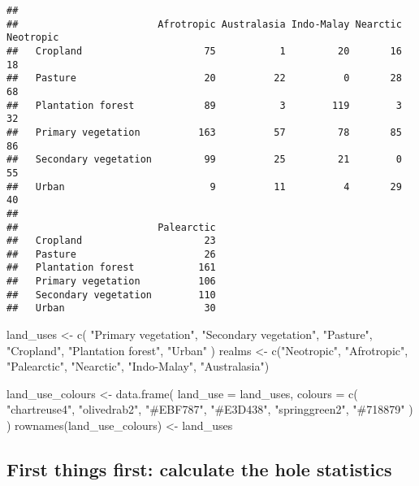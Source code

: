 \documentclass[
]{article}
\newenvironment{Shaded}{\begin{snugshade}}{\end{snugshade}}
\newcommand{\AttributeTok}[1]{\textcolor[rgb]{0.77,0.63,0.00}{#1}}
\newcommand{\FunctionTok}[1]{\textcolor[rgb]{0.00,0.00,0.00}{#1}}
\newcommand{\NormalTok}[1]{#1}
\newcommand{\OtherTok}[1]{\textcolor[rgb]{0.56,0.35,0.01}{#1}}
\newcommand{\StringTok}[1]{\textcolor[rgb]{0.31,0.60,0.02}{#1}}
\begin{document}
\begin{verbatim}
##                       
##                        Afrotropic Australasia Indo-Malay Nearctic Neotropic
##   Cropland                     75           1         20       16        18
##   Pasture                      20          22          0       28        68
##   Plantation forest            89           3        119        3        32
##   Primary vegetation          163          57         78       85        86
##   Secondary vegetation         99          25         21        0        55
##   Urban                         9          11          4       29        40
##                       
##                        Palearctic
##   Cropland                     23
##   Pasture                      26
##   Plantation forest           161
##   Primary vegetation          106
##   Secondary vegetation        110
##   Urban                        30
\end{verbatim}

\begin{Shaded}
\begin{Highlighting}[]
\NormalTok{land\_uses }\OtherTok{\textless{}{-}}
  \FunctionTok{c}\NormalTok{(}
    \StringTok{"Primary vegetation"}\NormalTok{,}
    \StringTok{"Secondary vegetation"}\NormalTok{,}
    \StringTok{"Pasture"}\NormalTok{,}
    \StringTok{"Cropland"}\NormalTok{,}
    \StringTok{"Plantation forest"}\NormalTok{,}
    \StringTok{"Urban"}
\NormalTok{  )}
\NormalTok{realms }\OtherTok{\textless{}{-}}
  \FunctionTok{c}\NormalTok{(}\StringTok{"Neotropic"}\NormalTok{,}
    \StringTok{"Afrotropic"}\NormalTok{,}
    \StringTok{"Palearctic"}\NormalTok{,}
    \StringTok{"Nearctic"}\NormalTok{,}
    \StringTok{"Indo{-}Malay"}\NormalTok{,}
    \StringTok{"Australasia"}\NormalTok{)}


\NormalTok{land\_use\_colours }\OtherTok{\textless{}{-}}
  \FunctionTok{data.frame}\NormalTok{(}
    \AttributeTok{land\_use =}\NormalTok{ land\_uses,}
    \AttributeTok{colours =} \FunctionTok{c}\NormalTok{(}
      \StringTok{"chartreuse4"}\NormalTok{,}
      \StringTok{"olivedrab2"}\NormalTok{,}
      \StringTok{"\#EBF787"}\NormalTok{,}
      \StringTok{"\#E3D438"}\NormalTok{,}
      \StringTok{"springgreen2"}\NormalTok{,}
      \StringTok{"\#718879"}
\NormalTok{    )}
\NormalTok{  )}
\FunctionTok{rownames}\NormalTok{(land\_use\_colours) }\OtherTok{\textless{}{-}}\NormalTok{ land\_uses}
\end{Highlighting}
\end{Shaded}

\hypertarget{first-things-first-calculate-the-hole-statistics}{%
\subsection{First things first: calculate the hole
statistics}\label{first-things-first-calculate-the-hole-statistics}}
\end{document}
